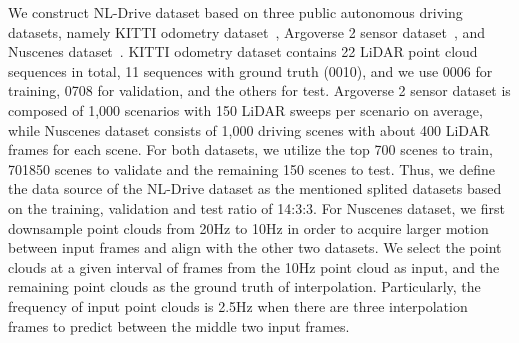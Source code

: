 \documentclass[10pt,twocolumn,letterpaper]{article}
\begin{document}
We construct NL-Drive dataset based on three public autonomous driving datasets, namely KITTI odometry dataset~\cite{geiger2012we}, Argoverse 2 sensor dataset~\cite{chang2019argoverse}, and Nuscenes dataset~\cite{caesar2020nuscenes}. KITTI odometry dataset contains 22 LiDAR point cloud sequences in total, 11 sequences with ground truth (0010), and we use 0006 for training, 0708 for validation, and the others for test. Argoverse 2 sensor dataset is composed of 1,000 scenarios with 150 LiDAR sweeps per scenario on average, while Nuscenes dataset consists of 1,000 driving scenes with about 400 LiDAR frames for each scene. For both datasets, we utilize the top 700 scenes to train, 701850 scenes to validate and the remaining 150 scenes to test. Thus, we define the data source of the NL-Drive dataset as the mentioned splited datasets based on the training, validation and test ratio of 14:3:3. For Nuscenes dataset, we first downsample point clouds from 20Hz to 10Hz in order to acquire larger motion between input frames and align with the other two datasets. We select the point clouds at a given interval of frames from the 10Hz point cloud as input, and the remaining point clouds as the ground truth of interpolation. Particularly, the frequency of input point clouds is 2.5Hz when there are three interpolation frames to predict between the middle two input frames. 
\end{document}
